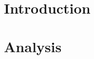 \chapter*{Introduction}
\setcounter{page}{1}

\begin{chapterabstract}
    \lipsum[1]
\end{chapterabstract}

\lipsum[1]

\chapter{Analysis}



